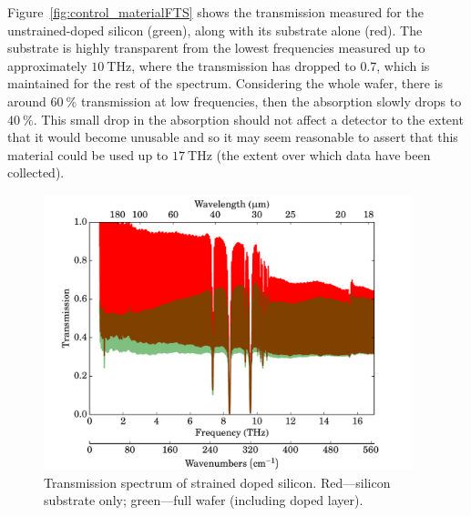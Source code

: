 \par
Figure~\ref{fig:control_materialFTS} shows the transmission measured for the unstrained-doped silicon (green), along with its substrate alone (red). The substrate is highly transparent from the lowest frequencies measured up to approximately $10~\mathrm{THz}$, where the transmission has dropped to $0.7$, which is maintained for the rest of the spectrum. Considering the whole wafer, there is around $60~\%$ transmission at low frequencies, then the absorption  slowly drops to $40~\%$. This small drop in the absorption should not affect a detector to the extent that it would become unusable and so it may seem reasonable to assert that this material could be used up to $17~\mathrm{THz}$ (the extent over which data have been collected).
\begin{figure}[tb]
\begin{center}
\includegraphics[width = 0.95\textwidth]{figures/strained_materialFTS}
\caption[Transmission spectrum of strained doped silicon]{Transmission spectrum of strained doped silicon. Red---silicon substrate only; green---full wafer (including doped layer).}
\label{fig:strained_materialFTS}
\end{center}
\end{figure}
\par 
